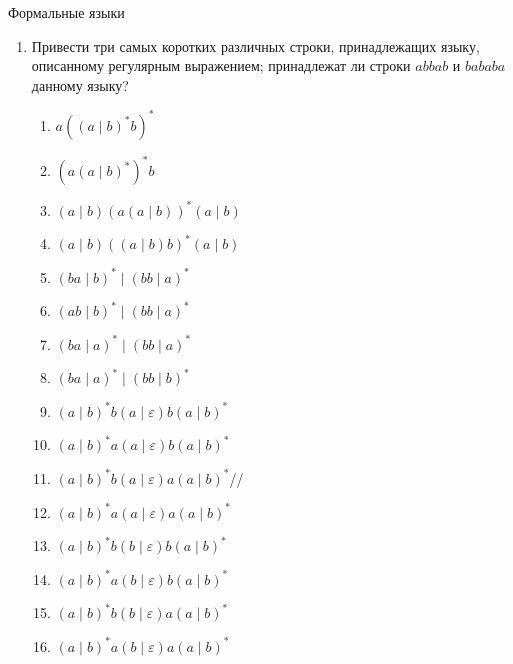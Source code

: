 \documentclass[12pt]{article}
\begin{document}
\begin{center}
{\LARGE Формальные языки}
\end{center}

\bigskip

\begin{enumerate}
\setlength\itemsep{1em}

  \item Привести три самых коротких различных строки, принадлежащих языку, описанному регулярным выражением; принадлежат ли строки $abbab$ и $bababa$ данному языку?
  \begin{enumerate}[label=\arabic*)]
    \setlength\itemsep{0.8em}
    \item $a ((a \mid b)^* b)^* $
    \item $(a (a \mid b)^*)^* b $
    \item $(a \mid b) (a (a \mid b))^* (a \mid b) $
    \item $(a \mid b) ((a \mid b) b)^* (a \mid b) $
    \item $(ba \mid b)^* \mid (bb \mid a)^*$
    \item $(ab \mid b)^* \mid (bb \mid a)^*$
    \item $(ba \mid a)^* \mid (bb \mid a)^*$
    \item $(ba \mid a)^* \mid (bb \mid b)^*$
    \item $(a \mid b)^* b (a \mid \varepsilon) b (a \mid b)^*$
    \item $(a \mid b)^* a (a \mid \varepsilon) b (a \mid b)^*$
    \item $(a \mid b)^* b (a \mid \varepsilon) a (a \mid b)^*$//
    \item $(a \mid b)^* a (a \mid \varepsilon) a (a \mid b)^*$
    \item $(a \mid b)^* b (b \mid \varepsilon) b (a \mid b)^*$
    \item $(a \mid b)^* a (b \mid \varepsilon) b (a \mid b)^*$
    \item $(a \mid b)^* b (b \mid \varepsilon) a (a \mid b)^*$
    \item $(a \mid b)^* a (b \mid \varepsilon) a (a \mid b)^*$
  \end{enumerate}


\end{enumerate}
\end{document}
